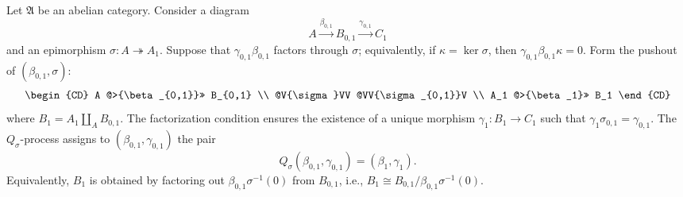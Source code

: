 \begin{definition}
Let $\mathfrak{A}$ be an abelian category. Consider a diagram
\[
A \xrightarrow{\beta_{0,1}} B_{0,1} \xrightarrow{\gamma_{0,1}} C_1
\]
and an epimorphism $\sigma : A \twoheadrightarrow A_1$. Suppose that $\gamma_{0,1}\beta_{0,1}$ factors through $\sigma$; equivalently, if $\kappa = \ker\sigma$, then $\gamma_{0,1}\beta_{0,1}\kappa = 0$. Form the pushout of $(\beta_{0,1}, \sigma)$:
\[
\begin{CD}
A @>{\beta_{0,1}}>> B_{0,1} \\
@V{\sigma}VV @VV{\sigma_{0,1}}V \\
A_1 @>{\beta_1}>> B_1
\end{CD}
\]
where $B_1 = A_1 \amalg_A B_{0,1}$. The factorization condition ensures the existence of a unique morphism $\gamma_1 : B_1 \to C_1$ such that $\gamma_1\sigma_{0,1} = \gamma_{0,1}$. The $Q_{\sigma}$-process assigns to $(\beta_{0,1}, \gamma_{0,1})$ the pair
\[
Q_{\sigma}(\beta_{0,1}, \gamma_{0,1}) = (\beta_1, \gamma_1).
\]
Equivalently, $B_1$ is obtained by factoring out $\beta_{0,1}\sigma^{-1}(0)$ from $B_{0,1}$, i.e., $B_1 \cong B_{0,1} / \beta_{0,1}\sigma^{-1}(0)$.
\end{definition}
